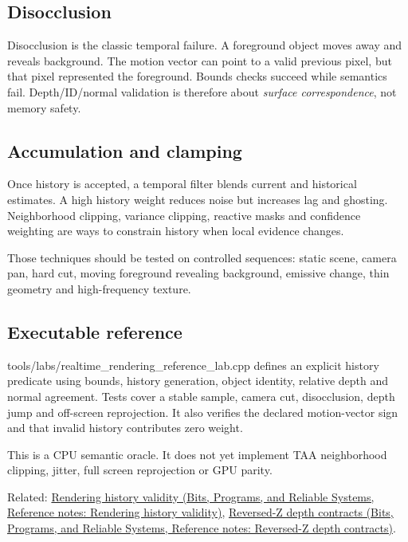 \subsection{Disocclusion}\label{appendix-e8c352e39466-disocclusion}

Disocclusion is the classic temporal failure. A foreground object moves away and reveals background. The motion vector can point to a valid previous pixel, but that pixel represented the foreground. Bounds checks succeed while semantics fail. Depth/ID/normal validation is therefore about \emph{surface correspondence}, not memory safety.

\subsection{Accumulation and clamping}\label{appendix-e8c352e39466-accumulation-and-clamping}

Once history is accepted, a temporal filter blends current and historical estimates. A high history weight reduces noise but increases lag and ghosting. Neighborhood clipping, variance clipping, reactive masks and confidence weighting are ways to constrain history when local evidence changes.

Those techniques should be tested on controlled sequences: static scene, camera pan, hard cut, moving foreground revealing background, emissive change, thin geometry and high-frequency texture.

\subsection{Executable reference}\label{appendix-e8c352e39466-executable-reference}

tools/labs/realtime\_rendering\_reference\_lab.cpp defines an explicit history predicate using bounds, history generation, object identity, relative depth and normal agreement. Tests cover a stable sample, camera cut, disocclusion, depth jump and off-screen reprojection. It also verifies the declared motion-vector sign and that invalid history contributes zero weight.

This is a CPU semantic oracle. It does not yet implement TAA neighborhood clipping, jitter, full screen reprojection or GPU parity.

Related: \href{../01-Bits-Programs-and-Reliable-Systems/main.pdf\#nameddest=appendix-2e7e9fd28a2c}{Rendering history validity (Bits, Programs, and Reliable Systems, Reference notes: Rendering history validity)}, \href{../01-Bits-Programs-and-Reliable-Systems/main.pdf\#nameddest=appendix-275ec8847057}{Reversed-Z depth contracts (Bits, Programs, and Reliable Systems, Reference notes: Reversed-Z depth contracts)}.
